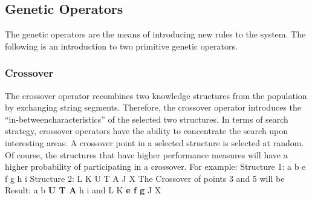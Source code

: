 \documentclass[a4paper,10pt]{article}
\begin{document}
\subsection{Genetic Operators}
The genetic operators are the means of introducing new rules to the system. The following is an introduction to two primitive genetic 
operators.
\newline
\newline
\newline
\newline
\subsubsection{Crossover}

The crossover operator recombines two knowledge structures from the population by exchanging string segments. Therefore, the crossover 
operator introduces the “in-betweencharacteristics” of the selected two structures. In terms of search strategy, crossover operators 
have the ability to concentrate the search upon interesting areas. A crossover point in a selected structure is selected at random. 
Of course, the structures that have higher performance measures will have a higher probability of participating in a crossover.
\newline
\newline
For example:
\newline
\newline
Structure 1: a b e f g h i
\newline 
Structure 2: L K U T A J X
\newline
\newline
The Crossover of points 3 and 5 will be
\newline
\newline
Result: a b \textbf{U T A} h i and L K \textbf{e f g} J X
\end{document}
